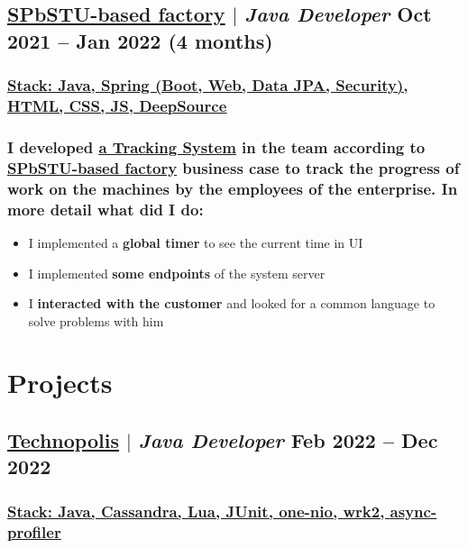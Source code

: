 \documentclass[11pt]{article}
\begin{document}
\subsection{\href{https://www.spbstu.ru/}{\underline{SPbSTU-based factory}} $|$ {\normalfont\textit{Java Developer}} \hfill Oct 2021 -- Jan 2022 (4 months)}
\subsubsection{\underline{\textbf{Stack}: Java, Spring (Boot, Web, Data JPA, Security), HTML, CSS, JS, \href{https://deepsource.com/}{DeepSource}}}
\subsubsection{I developed \href{https://github.com/martyn-fanclub/tracking-system}{\underline{a Tracking System}} in the team according to \href{https://www.spbstu.ru/}{\underline{SPbSTU-based factory}} business case to track the progress of work on the machines by the employees of the enterprise. In more detail what did I do:}
\begin{itemize}
    \item I implemented a \textbf{global timer} to see the current time in UI
    \item I implemented \textbf{some endpoints} of the system server
    \item I \textbf{interacted with the customer} and looked for a common language to solve problems with him
\end{itemize}

\section{Projects}
\subsection{\href{https://polis.vk.company/}{\underline{Technopolis}} $|$ {\normalfont\textit{Java Developer}} \hfill Feb 2022 -- Dec 2022}
\subsubsection{\underline{\textbf{Stack}: Java, Cassandra, Lua, JUnit, \href{https://github.com/odnoklassniki/one-nio}{one-nio}, \href{https://github.com/giltene/wrk2}{wrk2}, \href{https://github.com/async-profiler/async-profiler}{async-profiler}}}
\end{document}
